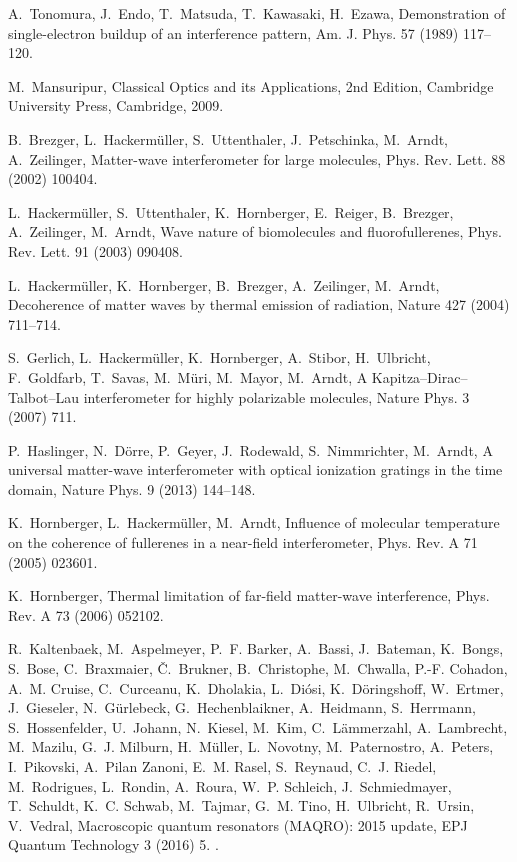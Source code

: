 \documentclass[3p,sort&compress]{elsarticle}
\begin{document}
\begin{thebibliography}{100}
A.~Tonomura, J.~Endo, T.~Matsuda, T.~Kawasaki, H.~Ezawa, Demonstration of
  single-electron buildup of an interference pattern, Am. J. Phys. 57 (1989)
  117--120.

M.~Mansuripur, Classical Optics and its Applications, 2nd Edition, Cambridge
  University Press, Cambridge, 2009.

B.~Brezger, L.~Hackerm{\"u}ller, S.~Uttenthaler, J.~Petschinka, M.~Arndt,
  A.~Zeilinger, Matter-wave interferometer for large molecules, Phys. Rev.
  Lett. 88 (2002) 100404.

L.~Hackerm{\"u}ller, S.~Uttenthaler, K.~Hornberger, E.~Reiger, B.~Brezger,
  A.~Zeilinger, M.~Arndt, Wave nature of biomolecules and fluorofullerenes,
  Phys. Rev. Lett. 91 (2003) 090408.

L.~Hackerm{\"u}ller, K.~Hornberger, B.~Brezger, A.~Zeilinger, M.~Arndt,
  Decoherence of matter waves by thermal emission of radiation, Nature 427
  (2004) 711--714.

S.~Gerlich, L.~Hackerm{\"u}ller, K.~Hornberger, A.~Stibor, H.~Ulbricht,
  F.~Goldfarb, T.~Savas, M.~M{\"u}ri, M.~Mayor, M.~Arndt, A
  {K}apitza--{D}irac--{T}albot--{L}au interferometer for highly polarizable
  molecules, Nature Phys. 3 (2007) 711.

P.~Haslinger, N.~D{\"o}rre, P.~Geyer, J.~Rodewald, S.~Nimmrichter, M.~Arndt, A
  universal matter-wave interferometer with optical ionization gratings in the
  time domain, Nature Phys. 9 (2013) 144--148.

K.~Hornberger, L.~Hackerm{\"u}ller, M.~Arndt, Influence of molecular
  temperature on the coherence of fullerenes in a near-field interferometer,
  Phys. Rev. A 71 (2005) 023601.

K.~Hornberger, Thermal limitation of far-field matter-wave interference, Phys.
  Rev. A 73 (2006) 052102.

R.~Kaltenbaek, M.~Aspelmeyer, P.~F. Barker, A.~Bassi, J.~Bateman, K.~Bongs,
  S.~Bose, C.~Braxmaier, {\v{C}}.~Brukner, B.~Christophe, M.~Chwalla, P.-F.
  Cohadon, A.~M. Cruise, C.~Curceanu, K.~Dholakia, L.~Di{\'o}si,
  K.~D{\"o}ringshoff, W.~Ertmer, J.~Gieseler, N.~G{\"u}rlebeck,
  G.~Hechenblaikner, A.~Heidmann, S.~Herrmann, S.~Hossenfelder, U.~Johann,
  N.~Kiesel, M.~Kim, C.~L{\"a}mmerzahl, A.~Lambrecht, M.~Mazilu, G.~J. Milburn,
  H.~M{\"u}ller, L.~Novotny, M.~Paternostro, A.~Peters, I.~Pikovski, A.~{Pilan
  Zanoni}, E.~M. Rasel, S.~Reynaud, C.~J. Riedel, M.~Rodrigues, L.~Rondin,
  A.~Roura, W.~P. Schleich, J.~Schmiedmayer, T.~Schuldt, K.~C. Schwab,
  M.~Tajmar, G.~M. Tino, H.~Ulbricht, R.~Ursin, V.~Vedral, Macroscopic quantum
  resonators ({MAQRO}): 2015 update, EPJ Quantum Technology 3 (2016) 5.
\newblock \href {http://dx.doi.org/10.1140/epjqt/s40507-016-0043-7}
  {}.


\end{thebibliography}
\end{document}
